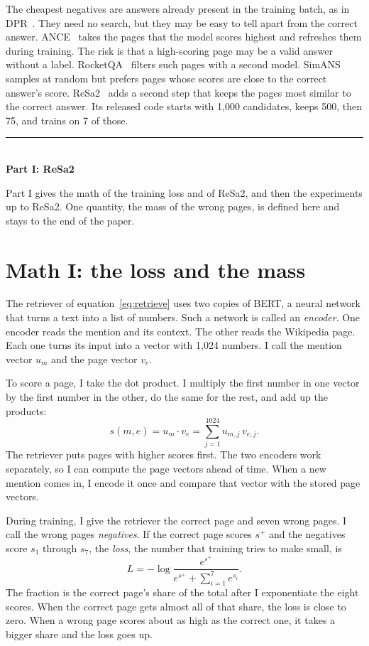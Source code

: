 \documentclass[11pt]{article}
\theoremstyle{definition}
\newcommand{\partline}[1]{\vspace{1.2em}\noindent\rule{\textwidth}{0.4pt}\\[0.3em]{\Large\bfseries #1}\par\vspace{0.4em}}
\begin{document}
\sloppy The cheapest negatives are answers already present in the training batch, as in DPR~\cite{karpukhin2020dpr}. They need no search, but they may be easy to tell apart from the correct answer. ANCE~\cite{xiong2021ance} takes the pages that the model scores highest and refreshes them during training. The risk is that a high-scoring page may be a valid answer without a label. RocketQA~\cite{qu2021rocketqa} filters such pages with a second model. SimANS~\cite{zhou2022simans} samples at random but prefers pages whose scores are close to the correct answer's score. ReSa2~\cite{li2025resa2} adds a second step that keeps the pages most similar to the correct answer. Its released code starts with 1,000 candidates, keeps 500, then 75, and trains on 7 of those.\par\fussy

\partline{Part I: ReSa2}

Part I gives the math of the training loss and of ReSa2, and then the experiments up to ReSa2. One quantity, the mass of the wrong pages, is defined here and stays to the end of the paper.

\section{Math I: the loss and the mass}
\label{sec:math}

The retriever of equation~\ref{eq:retrieve} uses two copies of BERT, a neural network that turns a text into a list of numbers. Such a network is called an \emph{encoder}. One encoder reads the mention and its context. The other reads the Wikipedia page. Each one turns its input into a vector with 1,024 numbers. I call the mention vector $u_m$ and the page vector $v_e$.

To score a page, I take the dot product. I multiply the first number in one vector by the first number in the other, do the same for the rest, and add up the products:
\begin{equation}
  s(m,e) = u_m \cdot v_e = \sum_{j=1}^{1024} u_{m,j}\, v_{e,j} .
  \label{eq:score}
\end{equation}
The retriever puts pages with higher scores first. The two encoders work separately, so I can compute the page vectors ahead of time. When a new mention comes in, I encode it once and compare that vector with the stored page vectors.

During training, I give the retriever the correct page and seven wrong pages. I call the wrong pages \emph{negatives}. If the correct page scores $s^{+}$ and the negatives score $s_1$ through $s_7$, the \emph{loss}, the number that training tries to make small, is
\begin{equation}
  L = -\log \frac{e^{s^{+}}}{e^{s^{+}} + \sum_{i=1}^{7} e^{s_i}} .
  \label{eq:loss}
\end{equation}
The fraction is the correct page's share of the total after I exponentiate the eight scores. When the correct page gets almost all of that share, the loss is close to zero. When a wrong page scores about as high as the correct one, it takes a bigger share and the loss goes up.
\end{document}
